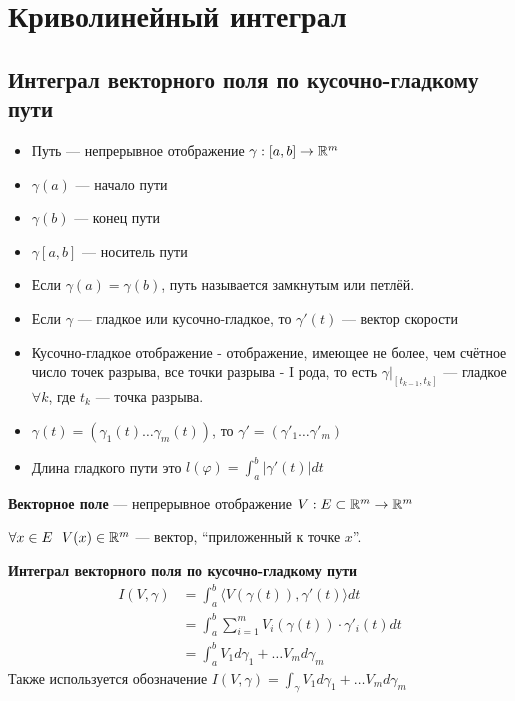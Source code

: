 \section*{Криволинейный интеграл}

\subsection*{Интеграл векторного поля по кусочно-гладкому пути}

\begin{definition}
	\begin{itemize}\itemfix
		\item Путь --- непрерывное отображение $\gamma : [a, b] \to\mathbb{R}^m$
		\item $\gamma(a)$ --- начало пути
		\item $\gamma(b)$ --- конец пути
		\item $\gamma[a, b]$ --- носитель пути
		\item Если $\gamma(a) = \gamma(b)$, путь называется замкнутым или петлёй.
		\item Если $\gamma$ --- гладкое или кусочно-гладкое, то $\gamma'(t)$ --- вектор скорости
		\item Кусочно-гладкое отображение - отображение, имеющее не более, чем счётное число точек разрыва, все точки разрыва - I рода, то есть $\gamma\Big|_{[t_{k-1}, t_k]}$ --- гладкое $\forall k$, где $t_k$ --- точка разрыва.
		\item $\gamma(t) = (\gamma_1(t) \ldots \gamma_m(t))$, то $\gamma' = (\gamma'_1 \ldots \gamma'_m)$
		\item Длина гладкого пути это $l(\varphi) = \int_a^b |\gamma'(t)|dt$
	\end{itemize}
\end{definition}

\begin{definition}
	\textbf{Векторное поле} --- непрерывное отображение $V : E\subset\mathbb{R}^m \to\mathbb{R}^m$

	$\forall x\in E \ \ V(x)\in\mathbb{R}^m$ --- вектор, ``приложенный к точке $x$''.
\end{definition}

\begin{definition}
	\textbf{Интеграл векторного поля по кусочно-гладкому пути}
	\begin{align}
		I(V, \gamma) & = \int_a^b \langle V(\gamma(t)), \gamma'(t)\rangle dt     \nonumber                             \\
		             & = \int_a^b \sum_{i=1}^m V_i(\gamma(t)) \cdot \gamma'_i(t) dt \label{int_vector_field_coordwise} \\
		             & = \int_a^b V_1 d\gamma_1 + \ldots V_m d\gamma_m \nonumber
	\end{align}
	Также используется обозначение $I(V, \gamma) = \int_{\gamma} V_1 d\gamma_1 + \ldots V_m d\gamma_m$
\end{definition}

